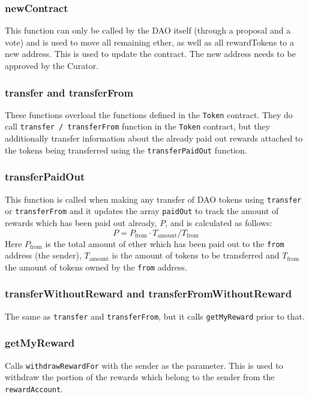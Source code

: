 \documentclass[9pt,oneside]{amsart}
\begin{document}
\begin{multicols}{2}
\subsubsection*{newContract}
This function can only be called by the DAO itself (through a proposal and a vote) and is used to move all remaining ether, as well as all rewardTokens to a new address. This is used to update the contract. The new address needs to be approved by the Curator.

\subsubsection*{transfer and transferFrom}
These functions overload the functions defined in the \verb|Token| contract. They do call \verb|transfer / transferFrom| function in the \verb|Token| contract, but they additionally transfer information about the already paid out rewards attached to the tokens being transferred using the \verb|transferPaidOut| function. 

\subsubsection*{transferPaidOut}
This function is called when making any transfer of DAO tokens using \verb|transfer| or \verb|transferFrom| and it updates the array \verb|paidOut| to track the amount of rewards which has been paid out already, $P$, and is calculated as follows:
\begin{equation}
 P = P_{\text{from}} \cdot T_{\text{amount}} / T_{\text{from}}
\end{equation}
Here $P_{\text{from}}$ is the total amount of ether which has been paid out to the \verb|from| address (the sender), $T_{\text{amount}}$ is the amount of tokens to be transferred and $T_{\text{from}}$ the amount of tokens owned by the \verb|from| address.

\subsubsection*{transferWithoutReward and transferFromWithoutReward}
The same as \verb|transfer| and \verb|transferFrom|, but it calls \verb|getMyReward| prior to that.

\subsubsection*{getMyReward}
Calls \verb|withdrawRewardFor| with the sender as the parameter. This is used to withdraw the portion of the rewards which belong to the sender from the \verb|rewardAccount|.


\end{multicols}
\end{document}
